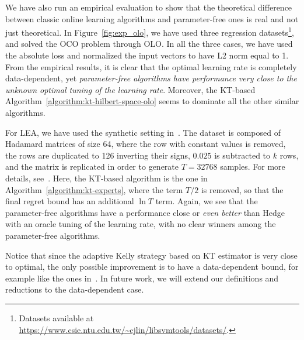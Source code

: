 We have also run an empirical evaluation to show that the theoretical difference
between classic online learning algorithms and parameter-free ones is real and not just theoretical. In
Figure~\ref{fig:exp_olo}, we have used three regression
datasets\footnote{Datasets available at
\url{https://www.csie.ntu.edu.tw/~cjlin/libsvmtools/datasets/}.}, and solved the
\ac{OCO} problem through \ac{OLO}. In all the three cases, we have used the
absolute loss and normalized the input vectors to have L2 norm equal to 1. From
the empirical results, it is clear that the optimal learning rate is completely
data-dependent, yet \emph{parameter-free algorithms have performance very close
to the unknown optimal tuning of the learning rate}. Moreover, the KT-based
Algorithm~\ref{algorithm:kt-hilbert-space-olo} seems to dominate all the other
similar algorithms.

For \ac{LEA}, we have used the synthetic setting
in~\cite{Chaudhuri-Freund-Hsu-2009}. The dataset is composed of Hadamard
matrices of size 64, where the row with constant values is removed, the rows are duplicated to 126 inverting their signs, $0.025$ is
subtracted to $k$ rows, and the matrix is replicated in order to generate
$T=32768$ samples. For more details, see~\cite{Chaudhuri-Freund-Hsu-2009}. Here,
the KT-based algorithm is the one in Algorithm~\ref{algorithm:kt-experts}, where
the term $T/2$ is removed, so that the final regret bound has an additional $\ln
T$ term.  Again, we see that the parameter-free algorithms have a performance
close or \emph{even better} than Hedge with an oracle tuning of the learning rate, with
no clear winners among the parameter-free algorithms.

Notice that since the adaptive Kelly strategy based on
KT estimator is very close to optimal, the only possible improvement is to
have a data-dependent bound, for example like the ones
in~\cite{Orabona-2014, Koolen-van-Erven-2015, Luo-Schapire-2015}.  In future work, we will extend our definitions
and reductions to the data-dependent case.


